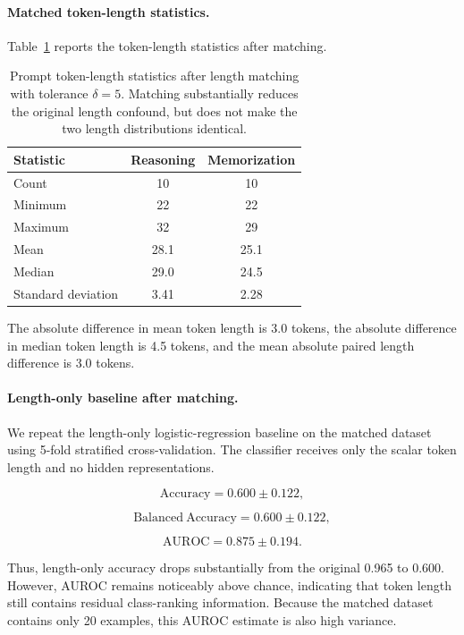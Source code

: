 \documentclass[11pt]{article}
\begin{document}
\paragraph{Matched token-length statistics.}

Table~\ref{tab:length-matched-stats} reports the token-length
statistics after matching.

\begin{table}[H]
    \centering
    \begin{tabular}{lcc}
        \toprule
        Statistic & Reasoning & Memorization \\
        \midrule
        Count & 10 & 10 \\
        Minimum & 22 & 22 \\
        Maximum & 32 & 29 \\
        Mean & 28.1 & 25.1 \\
        Median & 29.0 & 24.5 \\
        Standard deviation & 3.41 & 2.28 \\
        \bottomrule
    \end{tabular}
    \caption{
    Prompt token-length statistics after length matching with
    tolerance \(\delta=5\). Matching substantially reduces the original
    length confound, but does not make the two length distributions
    identical.
    }
    \label{tab:length-matched-stats}
\end{table}

The absolute difference in mean token length is 3.0 tokens, the
absolute difference in median token length is 4.5 tokens, and the mean
absolute paired length difference is 3.0 tokens.

\paragraph{Length-only baseline after matching.}

We repeat the length-only logistic-regression baseline on the matched
dataset using 5-fold stratified cross-validation. The classifier
receives only the scalar token length and no hidden representations.

\[
\mathrm{Accuracy}
=
0.600 \pm 0.122,
\]

\[
\mathrm{Balanced\ Accuracy}
=
0.600 \pm 0.122,
\]

\[
\mathrm{AUROC}
=
0.875 \pm 0.194.
\]

Thus, length-only accuracy drops substantially from the original
0.965 to 0.600. However, AUROC remains noticeably above chance,
indicating that token length still contains residual class-ranking
information. Because the matched dataset contains only 20 examples,
this AUROC estimate is also high variance.
\end{document}
